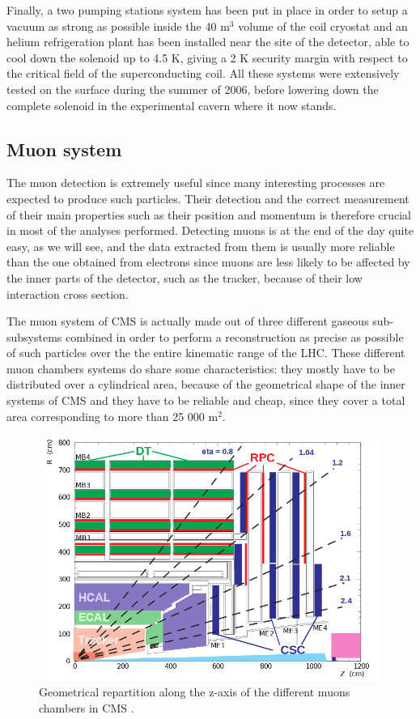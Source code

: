 \documentclass[a4paper, 10pt, openright]{report}
\begin{document}
Finally, a two pumping stations system has been put in place in order to setup a vacuum as strong as possible inside the 40 m$^3$ volume of the coil cryostat and an helium refrigeration plant has been installed near the site of the detector, able to cool down the solenoid up to 4.5 K, giving a 2 K security margin with respect to the critical field of the superconducting coil. All these systems were extensively tested on the surface during the summer of 2006, before lowering down the complete solenoid in the experimental cavern where it now stands.

\subsection{Muon system} \label{subsection:Muon}

The muon detection is extremely useful since many interesting processes are expected to produce such particles. Their detection and the correct measurement of their main properties such as their position and momentum is therefore crucial in most of the analyses performed. Detecting muons is at the end of the day quite easy, as we will see, and the data extracted from them is usually more reliable than the one obtained from electrons since muons are less likely to be affected by the inner parts of the detector, such as the tracker, because of their low interaction cross section.

The muon system of \ac{CMS} is actually made out of three different gaseous sub-subsystems combined in order to perform a reconstruction as precise as possible of such particles over the the entire kinematic range of the \ac{LHC}. These different muon chambers systems do share some characteristics: they mostly have to be distributed over a cylindrical area, because of the geometrical shape of the inner systems of \ac{CMS} and they have to be reliable and cheap, since they cover a total area corresponding to more than 25 000 m$^2$.

\begin{figure}[htbp]
\begin{center}
\includegraphics[width=12cm, height=8cm]{figs/CMSMuons.png}
\caption{Geometrical repartition along the z-axis of the different muons chambers in \ac{CMS} \cite{CMSMuons}.}
\label{fig:CMSMuons}
\end{center}
\end{figure}
\end{document}
